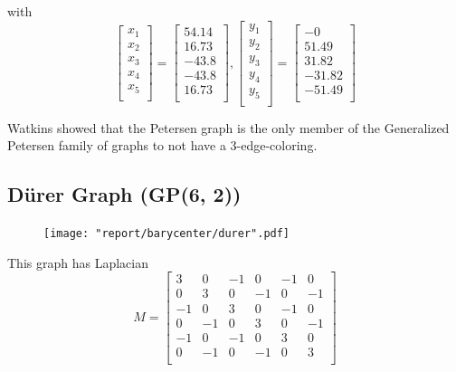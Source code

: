 \documentclass[11pt]{report}
\begin{document}
with
\[
\begin{bmatrix}
x_1 \\
x_2 \\
x_3 \\
x_4 \\
x_5 \\
\end{bmatrix} 
=
\begin{bmatrix}
54.14 \\
16.73 \\
-43.8 \\
-43.8 \\
16.73 \\
\end{bmatrix},
\begin{bmatrix}
y_1 \\
y_2 \\
y_3 \\
y_4 \\
y_5 \\
\end{bmatrix}  =
\begin{bmatrix}
-0 \\
51.49 \\
31.82 \\
-31.82 \\
-51.49 \\
\end{bmatrix} 
\]

Watkins showed that the Petersen graph is the only member of the Generalized Petersen family of graphs to not have a 3-edge-coloring.~\cite{watkins1969theorem}

\subsection{D{\"u}rer Graph (GP(6, 2))}
\begin{figure}[H]
    \centering
    \texttt{[image: "report/barycenter/durer".pdf]}
\end{figure}

This graph has Laplacian
\[
M = \begin{bmatrix}
3 & 0 & -1 & 0 & -1 & 0 \\
0 & 3 & 0 & -1 & 0 & -1 \\
-1 & 0 & 3 & 0 & -1 & 0 \\
0 & -1 & 0 & 3 & 0 & -1 \\
-1 & 0 & -1 & 0 & 3 & 0 \\
0 & -1 & 0 & -1 & 0 & 3 \\
\end{bmatrix}
\]
\end{document}
